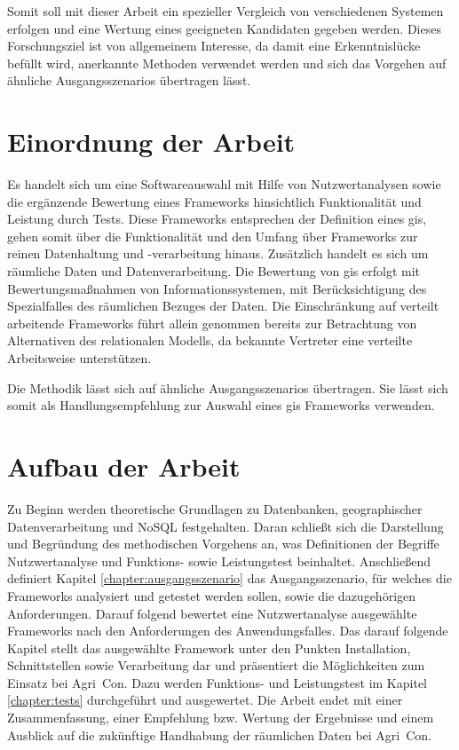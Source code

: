 Somit soll mit dieser Arbeit ein spezieller Vergleich von verschiedenen Systemen erfolgen und eine Wertung eines geeigneten Kandidaten gegeben werden.
Dieses Forschungsziel ist von allgemeinem Interesse, da damit eine Erkenntnislücke befüllt wird, anerkannte Methoden verwendet werden und sich das Vorgehen auf ähnliche Ausgangsszenarios übertragen lässt.

\section{Einordnung der Arbeit}
Es handelt sich um eine Softwareauswahl mit Hilfe von Nutzwertanalysen sowie die ergänzende Bewertung eines Frameworks hinsichtlich Funktionalität und Leistung durch Tests.
Diese Frameworks entsprechen der Definition eines \Gls{gis}, gehen somit über die Funktionalität und den Umfang über Frameworks zur reinen Datenhaltung und -verarbeitung hinaus.
Zusätzlich handelt es sich um räumliche Daten und Datenverarbeitung.
Die Bewertung von \Gls{gis} erfolgt mit Bewertungsmaßnahmen von Informationssystemen, mit Berücksichtigung des Spezialfalles des räumlichen Bezuges der Daten.
Die Einschränkung auf verteilt arbeitende Frameworks führt allein genommen bereits zur Betrachtung von Alternativen des relationalen Modells, da bekannte Vertreter eine verteilte Arbeitsweise unterstützen.

Die Methodik lässt sich auf ähnliche Ausgangsszenarios übertragen.
Sie lässt sich somit als Handlungsempfehlung zur Auswahl eines \Gls{gis} Frameworks verwenden.

\section{Aufbau der Arbeit}
Zu Beginn werden theoretische Grundlagen zu Datenbanken, geographischer Datenverarbeitung und NoSQL festgehalten.
Daran schließt sich die Darstellung und Begründung des methodischen Vorgehens an, was Definitionen der Begriffe Nutzwertanalyse und Funktions- sowie Leistungstest beinhaltet.
Anschließend definiert Kapitel \ref{chapter:ausgangsszenario} das Ausgangsszenario, für welches die Frameworks analysiert und getestet werden sollen, sowie die dazugehörigen Anforderungen.
Darauf folgend bewertet eine Nutzwertanalyse ausgewählte Frameworks nach den Anforderungen des Anwendungsfalles.
Das darauf folgende Kapitel stellt das ausgewählte Framework unter den Punkten Installation, Schnittstellen sowie Verarbeitung dar und präsentiert die Möglichkeiten zum Einsatz bei Agri~Con.
Dazu werden Funktions- und Leistungstest im Kapitel \ref{chapter:tests} durchgeführt und ausgewertet.
Die Arbeit endet mit einer Zusammenfassung, einer Empfehlung bzw. Wertung der Ergebnisse und einem Ausblick auf die zukünftige Handhabung der räumlichen Daten bei Agri~Con.



